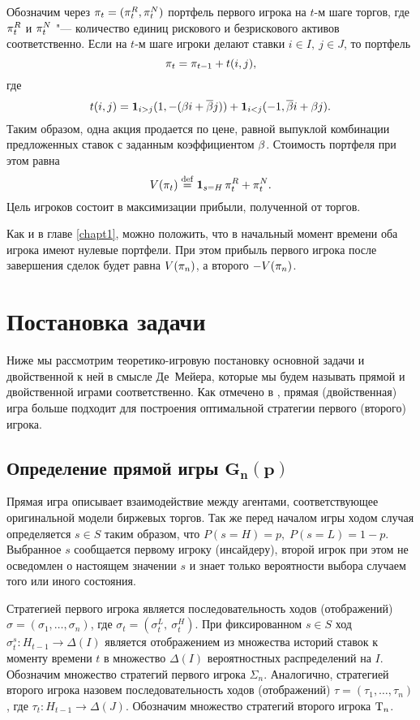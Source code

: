 {Обозначим через $\pi_{t} = (\pi_{t}^R, \pi_{t}^N)$ портфель первого игрока на $t$-м шаге торгов, где $\pi_{t}^R$ и $\pi_{t}^N$ "--- количество единиц рискового и безрискового активов соответственно.
Если на $t$-м шаге игроки делают ставки $i \in I,\ j \in J$, то портфель 
\[
\pi_{t} = \pi_{t-1} + t(i, j),
\]
где
\begin{equation}\label{ch3:eq:trans-mech}
  t(i, j) = \mathbf{1}_{i > j} (1, -(\beta i + {{\overline{\beta}}} j)) +
  \mathbf{1}_{i < j} (-1, {{\overline{\beta}}} i + \beta j).
\end{equation}
Таким образом, одна акция продается по цене, равной выпуклой комбинации предложенных ставок с заданным коэффициентом $\beta$.
Стоимость портфеля при этом равна
\begin{equation*}
  V(\pi_{t}) \overset{\mathrm{def}}{=} \mathbf{1}_{s = H} \, \pi_{t}^R + \pi_{t}^N.
\end{equation*}
Цель игроков состоит в максимизации прибыли, полученной от торгов.

Как и в главе \ref{chapt1}, можно положить, что в начальный момент времени оба игрока имеют нулевые портфели.
При этом прибыль первого игрока после завершения сделок будет равна $V(\pi_{n})$, а второго $-V(\pi_{n})$.

\section{Постановка задачи}
\label{ch3:sec:formal-descr}

Ниже мы рассмотрим теоретико-игровую постановку основной задачи и двойственной к ней в смысле Де~Мейера, которые мы будем называть прямой и двойственной играми соответственно.
Как отмечено в \cite{demeyer02}, прямая (двойственная) игра больше подходит для построения оптимальной стратегии первого (второго) игрока.

\subsection{Определение прямой игры $\mathbf{G_n(p)}$}
Прямая игра описывает взаимодействие между агентами, соответствующее оригинальной модели биржевых торгов.
Так же перед началом игры ходом случая определяется $s \in S$ таким образом, что $P(s = H) = p, \; P(s = L) = 1-p$.
Выбранное $s$ сообщается первому игроку (инсайдеру), второй игрок при этом не осведомлен о настоящем значении $s$ и знает только вероятности выбора случаем того или иного состояния.

Стратегией первого игрока является последовательность ходов (отображений) $\sigma = (\sigma_1, \ldots, \sigma_n)$, где $\sigma_t = (\sigma^L_t,\ \sigma^H_t)$.
При фиксированном $s \in S$ ход $\sigma^s_t: H_{t-1} \rightarrow \Delta(I)$ является отображением из множества историй ставок к моменту времени $t$ в множество $\Delta(I)$ вероятностных распределений на $I$.
Обозначим множество стратегий первого игрока $\Sigma_n$.
Аналогично, стратегией второго игрока назовем последовательность ходов (отображений) $\tau = (\tau_1, \ldots, \tau_n)$, где $\tau_t: H_{t-1} \rightarrow \Delta(J)$.
Обозначим множество стратегий второго игрока $\mathrm{T}_n$.

}
